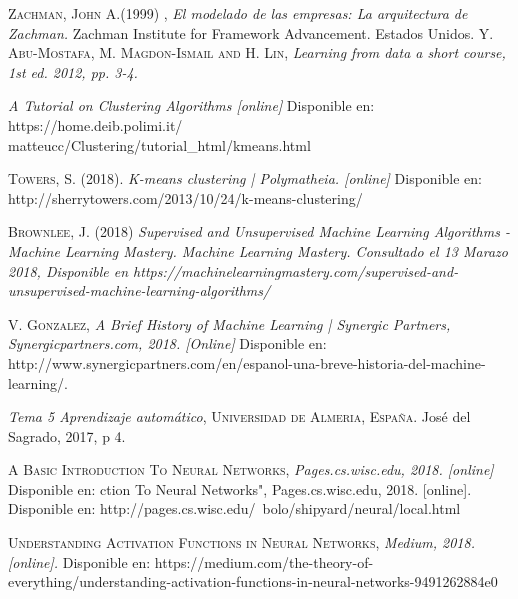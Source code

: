 \begin{thebibliography}{}
 \textsc{Zachman, John A.(1999) }, 
\textit{El modelado de las empresas: La arquitectura de Zachman.}
Zachman Institute for Framework Advancement. Estados Unidos.
 \textsc{Y. Abu-Mostafa, M. Magdon-Ismail and H. Lin}, 
\textit{Learning from data a short course, 1st ed. 2012, pp. 3-4.}

\textit{A Tutorial on Clustering Algorithms [online]}
Disponible en: https://home.deib.polimi.it/\\matteucc/Clustering/tutorial\_html/kmeans.html

 \textsc{Towers, S. (2018).}
\textit{K-means clustering | Polymatheia. [online]}
Disponible en: http://sherrytowers.com/2013/10/24/k-means-clustering/


 \textsc{Brownlee, J. (2018)}
\textit{Supervised and Unsupervised Machine Learning Algorithms - Machine Learning Mastery. Machine Learning Mastery. Consultado el 13 Marazo 2018, Disponible en https://machinelearningmastery.com/supervised-and-unsupervised-machine-learning-algorithms/}

 \textsc{V. Gonzalez}, 
\textit{A Brief History of Machine Learning | Synergic Partners, Synergicpartners.com, 2018. [Online]}
Disponible en: http://www.synergicpartners.com/en/espanol-una-breve-historia-del-machine-learning/.


 \textit{Tema 5 Aprendizaje automático},
\textsc{Universidad de Almeria, España.}
José del Sagrado, 2017, p 4.


 \textsc{A Basic Introduction To Neural Networks}, 
\textit{Pages.cs.wisc.edu, 2018. [online]}
Disponible en: ction To Neural Networks", Pages.cs.wisc.edu, 2018. [online]. Disponible en: http://pages.cs.wisc.edu/~bolo/shipyard/neural/local.html


 \textsc{Understanding Activation Functions in Neural Networks}, 
\textit{Medium, 2018. [online].} Disponible en: https://medium.com/the-theory-of-everything/understanding-activation-functions-in-neural-networks-9491262884e0



\end{thebibliography}
